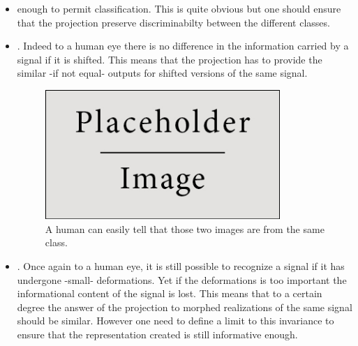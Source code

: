 \documentclass[a4paper,11pt]{report}
\begin{document}
      \begin{itemize}
				\item {} enough to permit classification. This is quite obvious but one should ensure that the projection preserve discriminabilty between the different classes.\\
	
				\item {}. Indeed to a human eye there is no difference in the information carried by a signal if it is shifted. This means that the projection has to provide the similar -if not equal- outputs for shifted versions of the same signal.\\
		
				\begin{figure}
				  \begin{center}
				    \includegraphics[width=3.5in]{placeholder.jpg}
				    \caption[Translation invariance]{A human can easily tell that those two images are from the same class.}
				    \label{fig:Illustration translation invariance}
				  \end{center}
				\end{figure}
	
				\item {}. Once again to a human eye, it is still possible to recognize a signal if it has undergone -small- deformations. Yet if the deformations is too important the informational content of the signal is lost. This means that to a certain degree the answer of the projection to morphed realizations of the same signal should be similar. However one need to define a limit to this invariance to ensure that the representation created is still informative enough.\\
				

\end{itemize}
\end{document}
